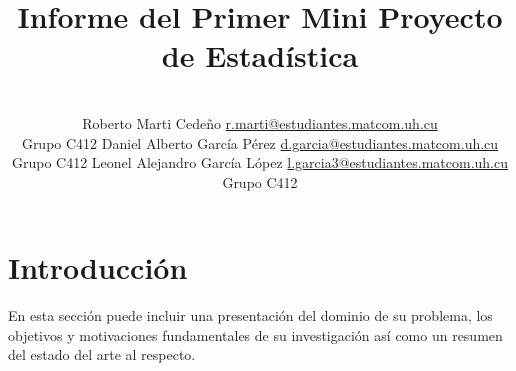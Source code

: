 \documentclass[a4paper,10pt,twocolumn]{article}
\title{Informe del Primer Mini Proyecto de Estad\'istica}
\author{\\
	\name Roberto Marti Cede\~no \email \href{mailto:r.marti@estudiantes.matcom.uh.cu}{r.marti@estudiantes.matcom.uh.cu}
	\\ \addr Grupo C412 \AND
	\name Daniel Alberto Garc\'ia P\'erez \email \href{mailto:d.garcia@estudiantes.matcom.uh.cu}{d.garcia@estudiantes.matcom.uh.cu}
	\\ \addr Grupo C412 \AND
	\name Leonel Alejandro Garc\'ia L\'opez \email \href{mailto:l.garcia3@estudiantes.matcom.uh.cu}{l.garcia3@estudiantes.matcom.uh.cu}
	\\ \addr Grupo C412}
\begin{document}



\section{Introducción}\label{sec:intro}
  En esta sección puede incluir una presentación del dominio de su problema,
  los objetivos y motivaciones fundamentales de su investigación así como un
  resumen del estado del arte al respecto.
\end{document}
